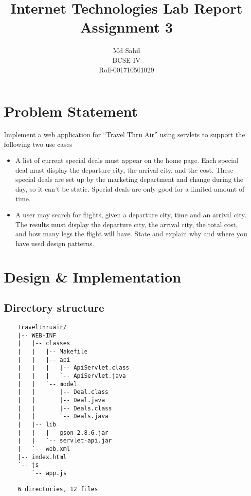 \documentclass[titlepage]{article}
\title{Internet Technologies Lab Report\\Assignment 3}
\author{Md Sahil\\BCSE IV\\Roll-001710501029}
\date{}
\begin{document}
    {\maketitle}

    \section{Problem Statement}

    Implement a web application for “Travel Thru Air” using servlets
    to support the following two use cases

    \begin{itemize}
        \item A list of current special deals must appear on the home page.
            Each special deal must display the departure
            city, the arrival city, and the cost. These special deals are
            set up by the marketing department and change
            during the day, so it can’t be static. Special deals are only
            good for a limited amount of time.
        \item A user may search for flights, given a departure city,
            time and an arrival city. The results must display
            the departure city, the arrival city, the total cost,
            and how many legs the flight will have.
            State and explain why and where you have used design patterns.
    \end{itemize}

    \section{Design \& Implementation}

    \subsection{Directory structure}
    \begin{verbatim}
    travelthruair/
    |-- WEB-INF
    |   |-- classes
    |   |   |-- Makefile
    |   |   |-- api
    |   |   |   |-- ApiServlet.class
    |   |   |   `-- ApiServlet.java
    |   |   `-- model
    |   |       |-- Deal.class
    |   |       |-- Deal.java
    |   |       |-- Deals.class
    |   |       `-- Deals.java
    |   |-- lib
    |   |   |-- gson-2.8.6.jar
    |   |   `-- servlet-api.jar
    |   `-- web.xml
    |-- index.html
    `-- js
        `-- app.js

    6 directories, 12 files
    \end{verbatim}
\end{document}
